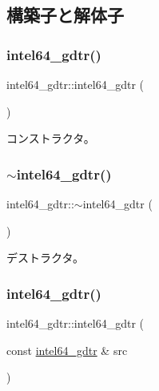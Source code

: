 \subsection{構築子と解体子}
\hypertarget{classintel64__gdtr_a547a30192b7a6416e1c4e003d2003982}{}\label{classintel64__gdtr_a547a30192b7a6416e1c4e003d2003982} 
\subsubsection{\texorpdfstring{intel64\+\_\+gdtr()}{intel64\_gdtr()}\hspace{0.1cm}{\footnotesize\ttfamily [1/3]}}
{\footnotesize\ttfamily intel64\+\_\+gdtr\+::intel64\+\_\+gdtr (\begin{DoxyParamCaption}{ }\end{DoxyParamCaption})}

コンストラクタ。 \hypertarget{classintel64__gdtr_a154c307381e614180e819057843196a7}{}\label{classintel64__gdtr_a154c307381e614180e819057843196a7} 
\subsubsection{\texorpdfstring{$\sim$intel64\+\_\+gdtr()}{~intel64\_gdtr()}}
{\footnotesize\ttfamily intel64\+\_\+gdtr\+::$\sim$intel64\+\_\+gdtr (\begin{DoxyParamCaption}{ }\end{DoxyParamCaption})\hspace{0.3cm}{\ttfamily [virtual]}}

デストラクタ。 \hypertarget{classintel64__gdtr_a92149e5369c4f35d2362c352e603633d}{}\label{classintel64__gdtr_a92149e5369c4f35d2362c352e603633d} 
\subsubsection{\texorpdfstring{intel64\+\_\+gdtr()}{intel64\_gdtr()}\hspace{0.1cm}{\footnotesize\ttfamily [2/3]}}
{\footnotesize\ttfamily intel64\+\_\+gdtr\+::intel64\+\_\+gdtr (\begin{DoxyParamCaption}\item[{const \hyperlink{classintel64__gdtr}{intel64\+\_\+gdtr} \&}]{src }\end{DoxyParamCaption})\hspace{0.3cm}{\ttfamily [delete]}}

